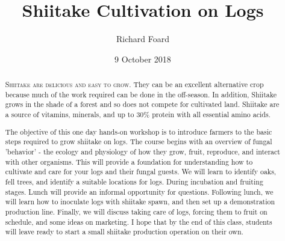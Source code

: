 \documentclass{tufte-handout}
\title{Shiitake Cultivation on Logs}
\author{Richard Foard}
\date{9 October 2018}  %
\begin{document}
\maketitle%


\begin{abstract}
\noindent \textsc{Shiitake are delicious and easy to grow.} They can be an excellent alternative crop because much of the work required can be done in the off-season. In addition, Shiitake grows in the shade of a forest and so does not compete for cultivated land. Shiitake are a source of vitamins, minerals, and up to 30\%
protein with all essential amino acids.
 
The objective of this one day hands-on workshop is to introduce farmers to the basic steps required to grow shiitake on logs. 
The course begins with an overview of fungal 'behavior' - the ecology and physiology of how they grow, fruit, reproduce, and interact with other organisms. 
This will provide a foundation for understanding how to cultivate and care for your logs and their fungal guests. We will learn to identify oaks, fell trees, and identify a suitable locations for logs. During incubation and fruiting stages. Lunch will provide an informal opportunity for questions. Following lunch, we will learn how to inoculate logs with shiitake spawn, and then set up a demonstration production line. Finally, we will discuss taking care of logs, forcing them to fruit on schedule, and some ideas on marketing. 
I hope that by the end of this class, students will leave ready to start a small shiitake production operation on their own. 
\end{abstract}


\end{document}
